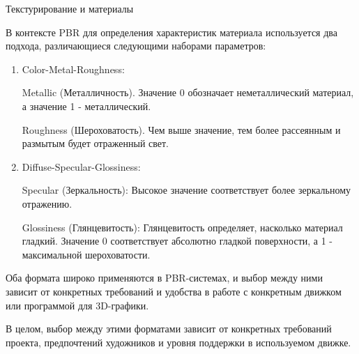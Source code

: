 \documentclass{beamer}
\begin{document}
	\begin{frame}{Текстурирование и материалы}

{	\footnotesize	
	В контексте PBR для определения характеристик материала используется два подхода, различающиеся следующими наборами параметров:

		\begin{enumerate}
			\item 
			Color-Metal-Roughness:
			
			Metallic (Металличность). %
			Значение 0 обозначает неметаллический материал, а значение 1 - металлический. 
			
			Roughness (Шероховатость). %
			Чем выше значение, тем более рассеянным и размытым будет отраженный свет.
			
			\item
			Diffuse-Specular-Glossiness:
			
			Specular (Зеркальность): %
			Высокое значение соответствует более зеркальному отражению.
			
			Glossiness (Глянцевитость): %
			Глянцевитость определяет, насколько материал гладкий. 
			Значение 0 соответствует абсолютно гладкой поверхности, а 1 - максимальной шероховатости.

	\end{enumerate}
		
		
Оба формата широко применяются в PBR-системах, и выбор между ними зависит от конкретных требований и удобства в работе с конкретным движком или программой для 3D-графики.

В целом, выбор между этими форматами зависит от конкретных требований проекта, предпочтений художников и уровня поддержки в используемом движке.
}


\end{frame}
\end{document}
